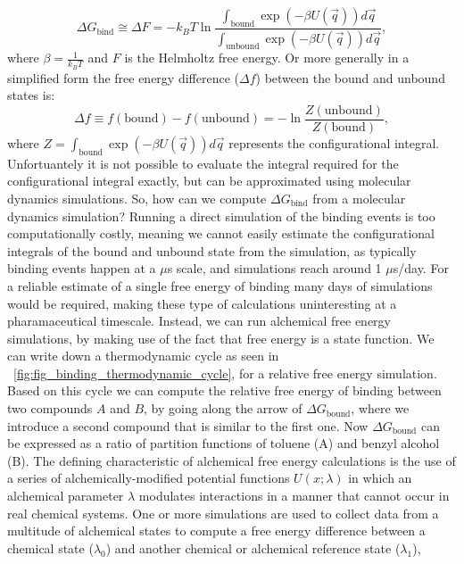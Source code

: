 \documentclass[9pt,bestpractices]{livecoms}
\begin{document}
\begin{equation}
    \Delta G_{\mathrm{bind}} \cong \Delta F= -k_BT\ln\frac{\int_\mathrm{bound} \exp(-\beta U(\vec{q}))d\vec{q}}{\int_\mathrm{unbound} \exp(-\beta U(\vec{q}))d\vec{q}},
\end{equation}
where $\beta = \frac{1}{k_BT}$ and $F$ is the Helmholtz free energy. 
Or more generally in a simplified form the free energy difference ($\Delta f$) between the bound and unbound states is:
\begin{equation}
\Delta f \equiv f(\mathrm{bound}) - f(\mathrm{unbound}) = -\ln\frac{Z(\mathrm{unbound})}{Z({\mathrm{bound}})},
\end{equation}
where $Z = \int_\mathrm{bound} \exp(-\beta U(\vec{q}))d\vec{q}$ represents the configurational integral. 
Unfortuantely it is not possible to evaluate the integral required for the configurational integral exactly, but can be approximated using molecular dynamics simulations. 
So, how can we compute $\Delta G_{\mathrm{bind}}$ from a molecular dynamics simulation? Running a direct simulation of the binding events is too computationally costly, meaning we cannot easily estimate the configurational integrals of the bound and unbound state from the simulation, as typically binding events happen at a $\mu$s scale, and simulations reach around 1 $\mu$s/day. For a reliable estimate of a single free energy of binding many days of simulations would be required, making these type of calculations uninteresting at a pharamaceutical timescale. Instead, we can run alchemical free energy simulations, by making use of the fact that free energy is a state function. We can write down a thermodynamic cycle as seen in ~\ref{fig:fig_binding_thermodynamic_cycle}, for a relative free energy simulation. Based on this cycle we can compute the relative free energy of binding between two compounds $A$ and $B$, by going along the arrow of $\Delta G_{\mathrm{bound}}$, where we introduce a second compound that is similar to the first one. Now $\Delta G_{\mathrm{bound}}$ can be expressed as a ratio of partition functions of toluene (A) and benzyl alcohol (B). 
The defining characteristic of alchemical free energy calculations is the use of a series of alchemically-modified potential functions $U(x; \lambda)$ in which an alchemical parameter $\lambda$ modulates interactions in a manner that cannot occur in real chemical systems.
One or more simulations are used to collect data from a multitude of alchemical states to compute a free energy difference between a chemical state ($\lambda_0$) and another chemical or alchemical reference state ($\lambda_1$),
\end{document}
